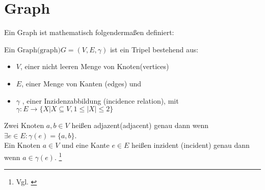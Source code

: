 \chapter*{Graph}
Ein Graph ist mathematisch folgendermaßen definiert: \\
\begin{definition}
    Ein $\text{Graph(graph)}G=(V,E,\gamma)$ ist ein Tripel bestehend aus:
    \begin{itemize}
        \item $V$, einer nicht leeren Menge von Knoten(vertices)
        \item $E$, einer Menge von Kanten (edges) und
        \item $\gamma$ , einer Inzidenzabbildung (incidence relation), mit\\
        $\gamma : E \longrightarrow \{X | X \subseteq V, 1 \leq |X| \leq 2\}$
    \end{itemize}
    Zwei Knoten $a,b \in V$ heißen adjazent(adjacent) genau dann wenn
    $\exists e \in E: \gamma(e)=\{a,b\}$. \\
    Ein Knoten $a \in V$ und eine Kante $e \in E$ heißen inzident (incident)
    genau dann wenn $a \in \gamma(e)$. \footnote{Vgl. \cite[Seite 21]{pbeck01}}
\end{definition}
